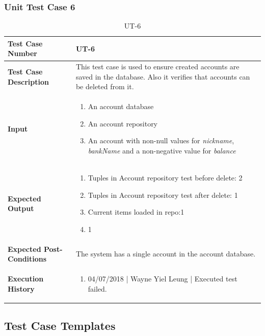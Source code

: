 \documentclass[12pt]{article}
\begin{document}
\subsubsection{Unit Test Case 6}
\begin{table}[htbp]
\centering
\caption {UT-6}
\label{UT-6}
\begin{tabularx}{\textwidth}{ | l | X |}
\hline
\textbf{Test Case Number}      &  UT-6                      \\ \hline
\textbf{Test Case Description}    &  This test case is used to ensure created accounts are saved in the database. Also it verifies that accounts can be deleted from it.                 \\ \hline
\textbf{Input}         & 	\begin{enumerate}
  
\item An account database
\item An account repository
\item An account with non-null values for \textit{nickname}, \textit{bankName} and a non-negative value for \textit{balance}
  
\end{enumerate} \\ \hline

\textbf{Expected Output}     & \begin{enumerate}
\item Tuples in Account repository test before delete: 2 
\item Tuples in Account repository test after delete: 1 
\item Current items loaded in repo:1 
\item 1

\end{enumerate} \\ \hline
\textbf{Expected Post-Conditions} & The system has a single account in the account database. \\
\hline
\textbf{Execution History}   &  \begin{enumerate}
	\item 04/07/2018 | Wayne Yiel Leung | Executed test failed.
\end {enumerate} \\ \hline
\end{tabularx}
\end{table}
\clearpage

\subsection{Test Case Templates}
\end{document}
